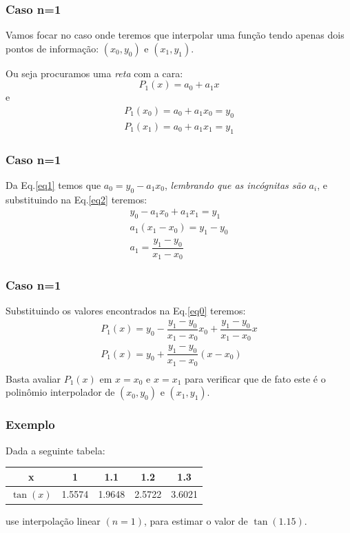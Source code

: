 \documentclass{beamer}
\theoremstyle{mystyle}
\begin{document}
\begin{frame}
	\frametitle{Caso n=1}
	Vamos focar no caso onde teremos que interpolar uma função tendo apenas dois pontos de informação: $ (x_{0}, y_{0})$ e $ (x_{1}, y_{1}) $.
	
	Ou seja procuramos uma \textit{reta} com a cara:
	\begin{equation}\label{eq0}
			P_{1}(x) = a_{0} + a_{1}x
	\end{equation}
	e
	\begin{gather}
		\label{eq1} P_{1}(x_{0}) = a_{0} + a_{1}x_{0} = y_{0} \\
		\label{eq2} P_{1}(x_{1}) = a_{0} + a_{1}x_{1} = y_{1} 
	\end{gather}
\end{frame}

\begin{frame}
	\frametitle{Caso n=1}
	Da Eq.\ref{eq1} temos que $ a_{0} = y_{0} - a_{1}x_{0}  $, \textit{lembrando que as incógnitas são} $ a_{i} $, e substituindo na Eq.\ref{eq2} teremos:	
	\begin{gather*}
		y_{0} - a_{1}x_{0} + a_{1}x_{1} = y_{1} \\
		a_{1}(x_{1} - x_{0}) = y_{1} - y_{0}\\
		a_{1} = \dfrac{y_{1} - y_{0}}{x_{1} - x_{0}}
	\end{gather*}
\end{frame}

\begin{frame}
	\frametitle{Caso n=1}
	Substituindo os valores encontrados na Eq.\ref{eq0} teremos:
	\begin{gather*}
		P_{1}(x) =  y_{0} - \dfrac{y_{1} - y_{0}}{x_{1} - x_{0}}x_{0} + \dfrac{y_{1} - y_{0}}{x_{1} - x_{0}}x\\
		P_{1}(x) =  y_{0} + \dfrac{y_{1} - y_{0}}{x_{1} - x_{0}}(x - x_{0})\\		
	\end{gather*}
	Basta avaliar $ P_{1}(x) $ em $ x = x_{0} $ e $  x = x_{1} $ para verificar que de fato este é o polinômio interpolador de $ (x_{0} , y_{0} ) $ e $ (x_{1} , y_{1} ) $.	
\end{frame}

\begin{frame}
	\frametitle{Exemplo}
	Dada a seguinte tabela:
	\begin{table}
		\centering
		\begin{tabular}{c|cccc}
			x & 1 & 1.1 & 1.2 & 1.3 \\
			\hline
			\hline
			$ \tan(x) $ & 1.5574 & 1.9648 & 2.5722 & 3.6021 
		\end{tabular}
	\end{table}
	use interpolação linear $ (n=1) $, para estimar o valor de $ \tan(1.15) $.
\end{frame}
\end{document}
